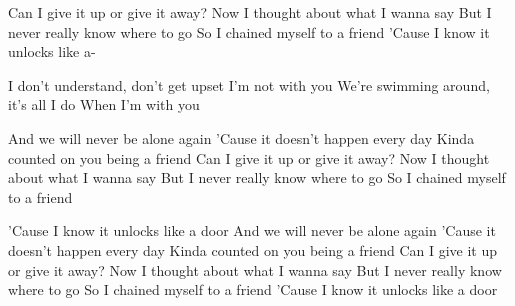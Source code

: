 Can I give it up or give it away?
Now I thought about what I wanna say
But I never really know where to go
So I chained myself to a friend
'Cause I know it unlocks like a-

I don't understand, don't get upset
I'm not with you
We’re swimming around, it's all I do
When I'm with you

And we will never be alone again
'Cause it doesn't happen every day
Kinda counted on you being a friend
Can I give it up or give it away?
Now I thought about what I wanna say
But I never really know where to go
So I chained myself to a friend

'Cause I know it unlocks like a door
And we will never be alone again
'Cause it doesn't happen every day
Kinda counted on you being a friend
Can I give it up or give it away?
Now I thought about what I wanna say
But I never really know where to go
So I chained myself to a friend
'Cause I know it unlocks like a door 
